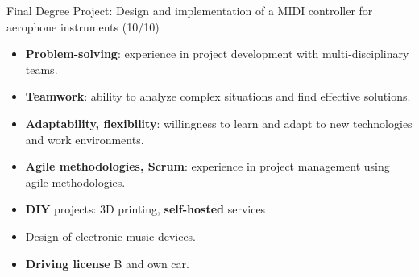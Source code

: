 \documentclass[10pt,a4paper,ragged2e,withhyper]{altacv}
\begin{document}
\begin{paracol}{2}
\divider


\faGraduationCap Final Degree Project: Design and implementation of a MIDI controller for aerophone instruments (10/10)


\divider
{}


\begin{itemize}
  \setlength{\itemindent}{0.5em}
  \item \textbf{Problem-solving}: experience in project development with multi-disciplinary teams.
  \item \textbf{Teamwork}: ability to analyze complex situations and find effective solutions.
  \item \textbf{Adaptability, flexibility}: willingness to learn and adapt to new technologies and work environments.
  \item \textbf{Agile methodologies, Scrum}: experience in project management using agile methodologies.
\end{itemize}

\medskip


\begin{itemize}
  \setlength{\itemindent}{0.5em}
  \item \textbf{DIY} projects: 3D printing, \textbf{self-hosted} services
   \\ 
  \item Design of electronic music devices.
  \item \textbf{Driving license} B and own car.
\end{itemize}





\end{paracol}
\end{document}
